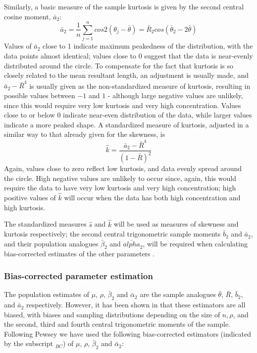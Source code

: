\documentclass[../../ArchStats.tex]{subfiles}
\begin{document}
Similarly, a basic measure of the sample kurtosis is given by the second central cosine moment, $\bar{a}_2$:
\[ \bar{a}_2 = \frac{1}{n} \sum_{j=1}^n cos 2(\theta_j-\bar{\theta}) = \bar{R}_2 cos(\bar{\theta}_2 - 2\bar{\theta}) \]
Values of $\bar{a}_2$ close to 1 indicate maximum peakedness of the distribution, with the data points almost identical; values close to 0 suggest that the data is near-evenly distributed around the circle. To compensate for the fact that kurtosis is so closely related to the mean resultant length, an adjustment is usually made, and $\bar{a}_2 - \bar{R}^4$ is usually given as the non-standardized measure of kurtosis, resulting in possible values between $-1$ and $1$ - although large negative values are unlikely, since this would require very low kurtosis and very high concentration. Values close to or below 0 indicate near-even distribution of the data, while larger values indicate a more peaked shape. A standardized measure of kurtosis, adjusted in a similar way to that already given for the skewness, is
\[ \hat{k} = \frac{\bar{a}_2 - \bar{R}^4}{(1-\bar{R})^2}\]
Again, values close to zero reflect low kurtosis, and data evenly spread around the circle. High negative values are unlikely to occur since, again, this would require the data to have very low kurtosis and very high concentration; high positive values of $\hat{k}$ will occur when the data has both high concentration and high kurtosis.

The standardized measures $\hat{s}$ and $\hat{k}$ will be used as measures of skewness and kurtosis respectively; the second central trigonometric sample moments $\bar{b}_2$ and $\bar{a}_2$, and their population analogues $\bar{\beta}_2$ and $\bar{alpha}_2$, will be required when calculating bias-corrected estimates of the other parameters .


\subsubsection{Bias-corrected parameter estimation}
The population estimates of $\mu$, $\rho$, $\bar{\beta}_2$ and $\bar{\alpha}_2$ are the sample analogues $\bar{\theta}$, $\bar{R}$, $\bar{b}_2$, and $\bar{a}_2$ respectively. However, it has been shown in \cite{Pewsey2004b} that these estimators are all biased, with biases and sampling distributions depending on the size of $n, \rho$, and the second, third and fourth central trigonometric moments of the sample. Following Pewsey \cite{Pewsey2014} we have used the following bias-corrected estimators (indicated by the subscript $_{BC}$) of $\mu$, $\rho$, $\bar{\beta}_2$ and $\bar{\alpha}_2$:
\end{document}
